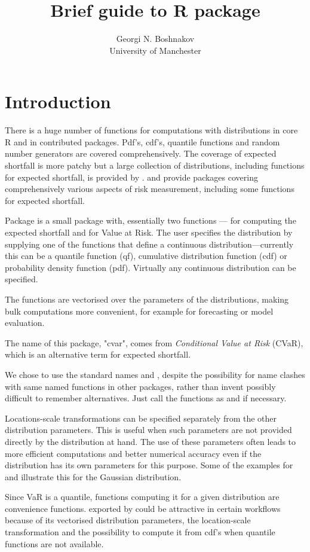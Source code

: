 \documentclass[nojss,article]{jss}
\title{Brief guide to R package \pkg{cvar}}
\author{Georgi N. Boshnakov \\ University of Manchester }
\begin{document}
\section{Introduction}
\label{sec:introduction}

There is a huge number of functions for computations with
distributions in core R and in contributed packages. Pdf's,
cdf's, quantile functions and random number generators are
covered comprehensively. The coverage of expected shortfall is
more patchy but a large collection of distributions, including
functions for expected shortfall, is provided by
\citet{VaRES2013}.
\citet{PerformanceAnalytics2018} and
\citet{actuarJSS2008} provide packages
covering comprehensively various aspects of risk measurement,
including some functions for expected shortfall.

Package  is a small package with, essentially two
functions ---  for computing the expected shortfall
and  for Value at Risk.  The user specifies the
distribution by supplying one of the functions that define a
continuous distribution---currently this can be a quantile
function (qf), cumulative distribution function (cdf) or
probability density function (pdf). Virtually any continuous
distribution can be specified.

The functions are vectorised over the parameters of the
distributions, making bulk computations more convenient, for
example for forecasting or model evaluation.

The name of this package, "cvar", comes from \emph{Conditional
Value at Risk} (CVaR), which is an alternative term for
expected shortfall.

We chose to use the standard names  and ,
despite the possibility for name clashes with same named
functions in other packages, rather than invent possibly
difficult to remember alternatives. Just call the functions as
 and  if necessary.

Locations-scale transformations can be specified separately
from the other distribution parameters. This is useful when
such parameters are not provided directly by the distribution
at hand. The use of these parameters often leads to more
efficient computations and better numerical accuracy even if
the distribution has its own parameters for this purpose. Some
of the examples for  and  illustrate this
for the Gaussian distribution.

Since VaR is a quantile, functions computing it for a given
distribution are convenience functions.  exported by
 could be attractive in certain workflows because of
its vectorised distribution parameters, the location-scale
transformation and the possibility to compute it from cdf's
when quantile functions are not available.
\end{document}
